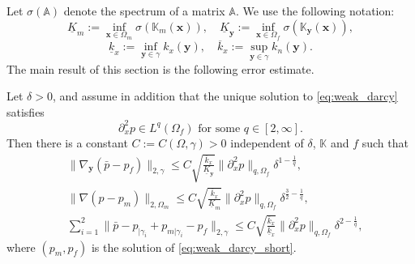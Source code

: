 \documentclass{llncs}
\def\vc#1{\mathbf{\boldsymbol{#1}}}     %
\def\tn#1{{\mathbb{#1}}}    %
\def\norm#1{\|#1\|}
\def\yy{{\vc y}}
\begin{document}


Let $\sigma(\tn A)$ denote the spectrum of a matrix $\tn A$.
We use the following notation:
\[ \underline K_m := \inf_{\vc x\in\Omega_m}\sigma(\tn K_m(\vc x)), \quad \underline K_\yy := \inf_{\vc x\in\Omega_f}\sigma(\tn K_\yy(\vc x)), \]
\[ \underline k_x := \inf_{\yy\in\gamma}k_x(\yy), \quad \overline k_x:=\sup_{\yy\in\gamma}k_n(\yy). \]
The main result of this section is the following error estimate.
\begin{theorem}
\label{th:error_estimate}
Let $\delta>0$, and assume in addition that the unique solution to \eqref{eq:weak_darcy} satisfies
\[ \partial_x^2 p\in L^q(\Omega_f) \mbox{ for some } q\in[2,\infty]. \]
Then there is a constant $C:=C(\Omega,\gamma)>0$ independent of $\delta$, $\tn K$ and $f$ such that
\begin{subequations}
\label{eq:error_estimates_delta}
\begin{align}
&\norm{\nabla_\yy(\bar p - p_f)}_{2,\gamma} \le C\sqrt{\frac{\overline k_x}{\underline K_\yy}}\norm{\partial_x^2 p}_{q,\Omega_f}\delta^{1-\frac1q},\\
&\norm{\nabla(p-p_m)}_{2,\Omega_m} \le C\sqrt{\frac{\overline k_x}{\underline K_m}}\norm{\partial_x^2 p}_{q,\Omega_f}\delta^{\frac32-\frac1q},\\
&\sum_{i=1}^2\norm{\bar p-p_{|\gamma_i}+p_{m|\gamma_i}-p_f}_{2,\gamma} \le C\sqrt{\frac{\overline k_x}{\underline k_x}}\norm{\partial_x^2 p}_{q,\Omega_f}\delta^{2-\frac1q},
\end{align}
\end{subequations}
where $(p_m,p_f)$ is the solution of \eqref{eq:weak_darcy_short}.
\end{theorem}
\end{document}
